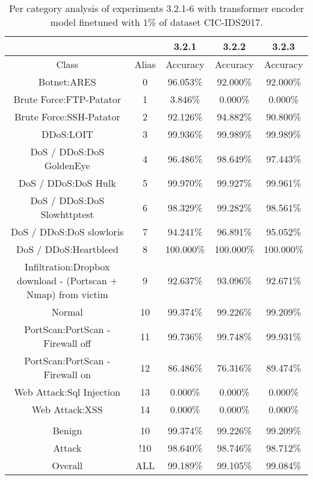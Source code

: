 \begin{table}[htb]
    \centering
    \begin{tabular}{@{}ccccc@{}}
        \toprule
         &  & 3.2.1 & 3.2.2 & 3.2.3 \\
        \midrule
        Class &  Alias &  Accuracy &  Accuracy &  Accuracy \\
        Botnet:ARES &  0 &  96.053\% &  92.000\% &  92.000\% \\
        Brute Force:FTP-Patator &  1 &  3.846\% &  0.000\% &  0.000\% \\
        Brute Force:SSH-Patator &  2 &  92.126\% &  94.882\% &  90.800\% \\
        DDoS:LOIT &  3 &  99.936\% &  99.989\% &  99.989\% \\
        DoS / DDoS:DoS GoldenEye &  4 &  96.486\% &  98.649\% &  97.443\% \\
        DoS / DDoS:DoS Hulk &  5 &  99.970\% &  99.927\% &  99.961\% \\
        DoS / DDoS:DoS Slowhttptest &  6 &  98.329\% &  99.282\% &  98.561\% \\
        DoS / DDoS:DoS slowloris &  7 &  94.241\% &  96.891\% &  95.052\% \\
        DoS / DDoS:Heartbleed &  8 &  100.000\% &  100.000\% &  100.000\% \\
        Infiltration:Dropbox download - (Portscan + Nmap) from victim &  9 &  92.637\% &  93.096\% &  92.671\% \\
        Normal &  10 &  99.374\% &  99.226\% &  99.209\% \\
        PortScan:PortScan - Firewall off &  11 &  99.736\% &  99.748\% &  99.931\% \\
        PortScan:PortScan - Firewall on &  12 &  86.486\% &  76.316\% &  89.474\% \\
        Web Attack:Sql Injection &  13 &  0.000\% &  0.000\% &  0.000\% \\
        Web Attack:XSS &  14 &  0.000\% &  0.000\% &  0.000\% \\
         \\
        Benign &  10 &  99.374\% &  99.226\% &  99.209\% \\
        Attack &  !10 &  98.640\% &  98.746\% &  98.712\% \\
        Overall &  ALL &  99.189\% &  99.105\% &  99.084\% \\
        \bottomrule
    \end{tabular}
    \caption{Per category analysis of experiments 3.2.1-6 with transformer encoder model finetuned with 1\% of dataset CIC-IDS2017.}
    \label{table:results:lstm:class_flows_1}
\end{table}
